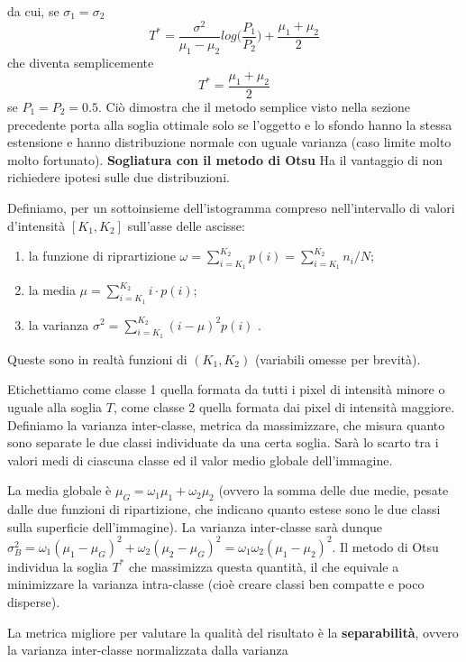 \documentclass[a4paper,11pt]{article}
\begin{document}
da cui, se $\sigma_1 = \sigma_2$
\[
T^* = \frac{\sigma^2}{\mu_1 - \mu_2} log\Bigg(\frac{P_1}{P_2}\Bigg) + \frac{\mu_1 + \mu_2}{2}
\]
che diventa semplicemente
\[
T^* = \frac{\mu_1 + \mu_2}{2}
\]
se $P_1 = P_2 = 0.5$. Ciò dimostra che il metodo semplice visto nella sezione precedente porta alla soglia ottimale solo se l'oggetto e lo sfondo
hanno la stessa estensione e hanno distribuzione normale con uguale varianza (caso limite molto molto fortunato).
\newline
\newline
\textbf{Sogliatura con il metodo di Otsu}
\newline
Ha il vantaggio di non richiedere ipotesi sulle due distribuzioni.
\par
Definiamo, per un sottoinsieme dell'istogramma compreso nell'intervallo di valori d'intensità $[K_1,K_2]$ sull'asse delle ascisse:
\begin{enumerate}
    \item la funzione di riprartizione $\omega = \sum_{i=K_1}^{K_2}p(i) = \sum_{i=K_1}^{K_2}n_i/N$;
    \item la media $\mu = \sum_{i=K_1}^{K_2} i \cdot p(i)$;
    \item la varianza $\sigma^2 = \sum_{i=K_1}^{K_2}(i-\mu)^2p(i)$ .
\end{enumerate}
Queste sono in realtà funzioni di $(K_1, K_2)$ (variabili omesse per brevità).
\par
Etichettiamo come classe 1 quella formata da tutti i pixel di intensità minore o uguale alla soglia $T$, come classe 2 quella formata dai pixel di intensità
maggiore. Definiamo la varianza inter-classe, metrica da massimizzare, che misura quanto sono separate le due classi individuate da una certa soglia.
Sarà lo scarto tra i valori medi di ciascuna classe ed il valor medio globale dell'immagine.
\par
La media globale è $\mu_G = \omega_1 \mu_1 + \omega_2 \mu_2$ (ovvero la somma delle due medie, pesate dalle due funzioni di ripartizione, che indicano
quanto estese sono le due classi sulla superficie dell'immagine). La varianza inter-classe sarà dunque $\sigma_B^2 = \omega_1 (\mu_1 - \mu_G)^2 +
\omega_2 (\mu_2 - \mu_G)^2 = \omega_1 \omega_2 (\mu_1 - \mu_2)^2$. Il metodo di Otsu individua la soglia $T^*$ che massimizza questa quantità, il che equivale
a minimizzare la varianza intra-classe (cioè creare classi ben compatte e poco disperse).
\par
La metrica migliore per valutare la qualità del risultato è la \textbf{separabilità}, ovvero la varianza inter-classe normalizzata dalla varianza
\end{document}
